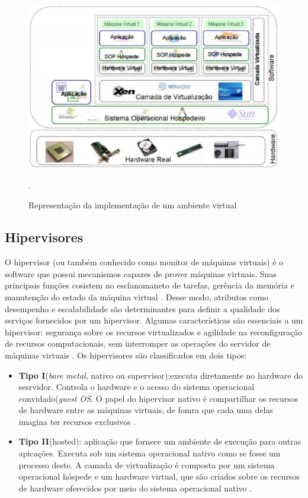 \begin{figure}[!htb]
\centering
\includegraphics [keepaspectratio=true,scale=0.40]{figuras/virtualization_arc.eps}
\caption{Representação da implementação de um ambiente virtual}
\cite{junior}.
\label{arc_virtualization}
\end{figure} 
 
\subsection{Hipervisores}
O hipervisor (ou também conhecido como monitor de máquinas virtuais) é o software que possui mecanismos capazes de prover máquinas virtuais. Suas principais funções cosistem no esclanomaneto de tarefas, gerência da memória e manutenção do estado da máquina virtual \cite{manoel}. Desse modo, atributos como desempenho e escalabilidade são determinantes para definir a qualidade dos serviços fornecidos por um hipervisor. Algumas características são essenciais a um hipervisor: segurança sobre os recursos virtualizados e agilidade na reconfiguração de recursos computacionais, sem interromper as operações do servidor de máquinas virtuais \cite{manoel}. Os hipervisores são classificados em dois tipos:

\begin{itemize}
\item \textbf{Tipo I}(\textit{bare metal}, nativo ou supervisor):executa diretamente no hardware do sesrvidor. Controla o hardware e o acesso do sistema operacional convidado(\textit{guest OS}. O papel do hipervisor nativo é compartilhar os recursos de hardware entre as máquinas virtuais, de fomra que cada uma delas imagina ter recursos exclusivos \cite{manoel}.

\item \textbf{Tipo II}(hosted): aplicação que fornece um ambiente de execução para outras apicações. Executa sob um sistema operacional nativo como se fosse um processo deste. A camada de virtualização é composta por um sistema operacional hóspede e um hardware virtual, que são criados sobre os recursos de hardware oferecidos por meio do sistema operacional nativo \cite{manoel}.
\end{itemize}


